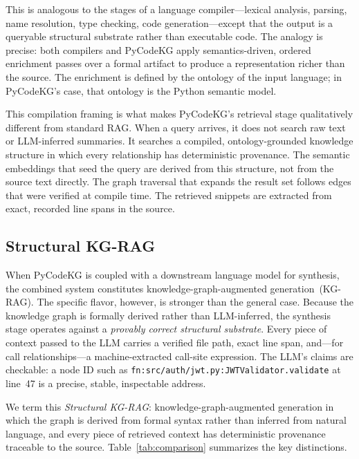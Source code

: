 \documentclass[10pt]{article}
\begin{document}
This is analogous to the stages of a language compiler---lexical analysis,
parsing, name resolution, type checking, code generation---except that the output
is a queryable structural substrate rather than executable code. The analogy is
precise: both compilers and PyCodeKG apply semantics-driven, ordered enrichment
passes over a formal artifact to produce a representation richer than the source.
The enrichment is defined by the ontology of the input language; in PyCodeKG's
case, that ontology is the Python semantic model.

This compilation framing is what makes PyCodeKG's retrieval stage qualitatively
different from standard RAG. When a query arrives, it does not search raw text
or LLM-inferred summaries. It searches a compiled, ontology-grounded knowledge
structure in which every relationship has deterministic provenance. The semantic
embeddings that seed the query are derived from this structure, not from the source
text directly. The graph traversal that expands the result set follows edges that
were verified at compile time. The retrieved snippets are extracted from exact,
recorded line spans in the source.

\subsection{Structural KG-RAG}

When PyCodeKG is coupled with a downstream language model for synthesis, the combined
system constitutes knowledge-graph-augmented generation~(KG-RAG). The specific
flavor, however, is stronger than the general case. Because the knowledge graph is
formally derived rather than LLM-inferred, the synthesis stage operates against a
\emph{provably correct structural substrate}. Every piece of context passed to the
LLM carries a verified file path, exact line span, and---for call relationships---a
machine-extracted call-site expression. The LLM's claims are checkable: a node ID
such as \texttt{fn:src/auth/jwt.py:JWTValidator.validate} at line~47 is a precise,
stable, inspectable address.

We term this \emph{Structural KG-RAG}: knowledge-graph-augmented generation in
which the graph is derived from formal syntax rather than inferred from natural
language, and every piece of retrieved context has deterministic provenance
traceable to the source. Table~\ref{tab:comparison} summarizes the key distinctions.
\end{document}
